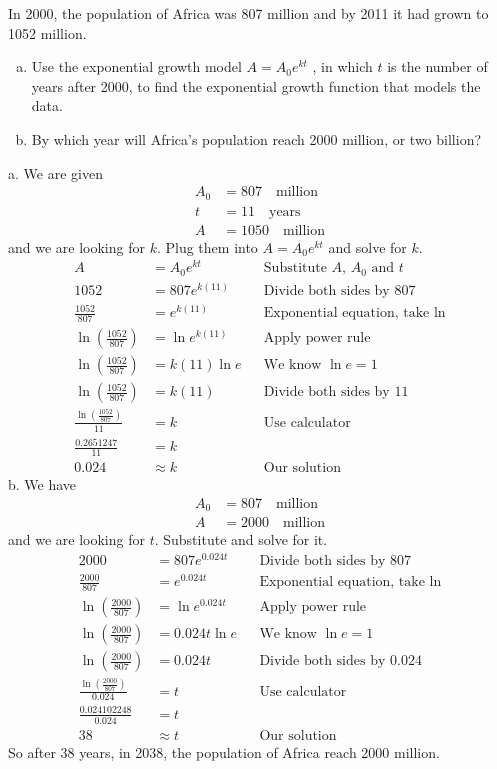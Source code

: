 \begin{exa}
In 2000, the population of Africa was 807 million and by 2011 it had grown to 1052
million. 
	\begin{enumerate}[a.]
	 \item Use the exponential growth model $A = A_0 e^{kt}$ , in which $t$ is the number of years after 2000, to find the exponential growth function that models the data.
	 \item By which year will Africa’s population reach 2000 million, or two billion?
	\end{enumerate}
a. We are given 
		\begin{align*}
				A_0&=807 \quad \text{million}\\
				t &=11 \quad \text{years}\\
				A &= 1050 \quad \text{million}
		\end{align*}
and we are looking for $k$. Plug them into $A = A_0 e^{kt}$ and solve for $k$.
		\begin{align*}
			A &= A_0e^{kt} &&\text{Substitute $A$, $A_0$ and $t$}\\
			1052 &= 807e^{k(11)} &&\text{Divide both sides by 807}\\
			\frac{1052}{807} &= e^{k(11)} &&\text{Exponential equation, take ln}\\
			\ln{\left(\frac{1052}{807}\right)} &= \ln{e^{k(11)}} &&\text{Apply power rule}\\
			\ln{\left(\frac{1052}{807}\right)} &=k(11)\ln{e} &&\text{We know $\ln{e}=1$}\\
			\ln{\left(\frac{1052}{807}\right)} &=k(11) &&\text{Divide both sides by 11}
				\\
			\frac{\ln{\left(\frac{1052}{807}\right)}}{11} &=k &&\text{Use calculator}\\
			\frac{0.2651247}{11} &= k && \\
			0.024 &\approx k && \text{Our solution}	
		\end{align*}
b. We have
		\begin{align*}
				A_0&=807 \quad \text{million}\\
				A &= 2000 \quad \text{million}
		\end{align*}
and we are looking for $t$. Substitute and solve for it.
		\begin{align*}
			2000 &= 807e^{0.024t} &&\text{Divide both sides by 807}\\
			\frac{2000}{807} &= e^{0.024t} &&\text{Exponential equation, take ln}\\
			\ln{\left(\frac{2000}{807}\right)} &= \ln{e^{0.024t}} &&\text{Apply power rule}\\
			\ln{\left(\frac{2000}{807}\right)} &=0.024t\ln{e} &&\text{We know $\ln{e}=1$}\\
			\ln{\left(\frac{2000}{807}\right)} &=0.024t &&\text{Divide both sides by 0.024}\\
			\frac{\ln{\left(\frac{2000}{807}\right)}}{0.024} &=t &&\text{Use calculator}\\
			\frac{0.024102248}{0.024} &= t && \\
			38 &\approx t && \text{Our solution}	
		\end{align*}
So after 38 years, in 2038, the population of Africa reach 2000 million.
\end{exa}
